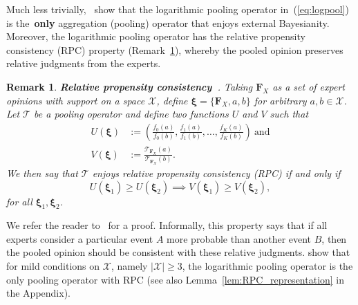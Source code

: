 \documentclass[a4paper, notitlepage, 10pt]{article}
\newtheorem{remark}{Remark}[]
\begin{document}
Much less trivially,~\cite{Genest1984} show that the logarithmic pooling operator in~(\ref{eq:logpool}) is the~\textbf{only} aggregation (pooling) operator that enjoys external Bayesianity.
Moreover, the logarithmic pooling operator has the relative propensity consistency (RPC) property (Remark~\ref{rmk:properties_RPC}), whereby the pooled opinion preserves relative judgments from the experts.
\begin{remark}
\label{rmk:properties_RPC}
\textbf{Relative propensity consistency~\citep{Genest1984}}.
Taking $\boldsymbol F_{X}$ as a set of expert opinions with support on a space $\mathcal{X}$, define $\boldsymbol \xi = \{\boldsymbol F_{X}, a, b\}$ for arbitrary $a , b \in \mathcal{X}$.
Let $\mathcal{T}$ be a pooling operator and define two functions $U$ and $V$ such that 
\begin{align}
 U(\boldsymbol \xi) &:= \left( \frac{f_0(a)}{f_0(b)}, \frac{f_1(a)}{f_1(b)}, \ldots, \frac{f_K(a)}{f_K(b)} \right)\:\text{and}\\
 V(\boldsymbol \xi) & := \frac{\mathcal{T}_{\boldsymbol F_{X}} (a)}{\mathcal{T}_{\boldsymbol F_{X}} (b)}.
\end{align}
We then say that $\mathcal{T}$ enjoys \textit{relative propensity consistency} (RPC) if and only if
\begin{equation}
 U(\boldsymbol \xi_1) \geq U(\boldsymbol \xi_2) \implies  V(\boldsymbol \xi_1) \geq V(\boldsymbol \xi_2),
\end{equation}
for all $\boldsymbol \xi_1, \boldsymbol \xi_2$.
\end{remark}
We refer the reader to~\cite{Genest1984} for a proof.
Informally, this property says that if all experts consider a particular event $A$ more probable than another event $B$, then the pooled opinion should be consistent with these relative judgments. 
\cite{Genest1984} show that for mild conditions on $\mathcal{X}$, namely $|\mathcal{X}| \geq 3$, the logarithmic pooling operator is the only pooling operator with RPC (see also Lemma~\ref{lem:RPC_representation} in the Appendix).
\end{document}
